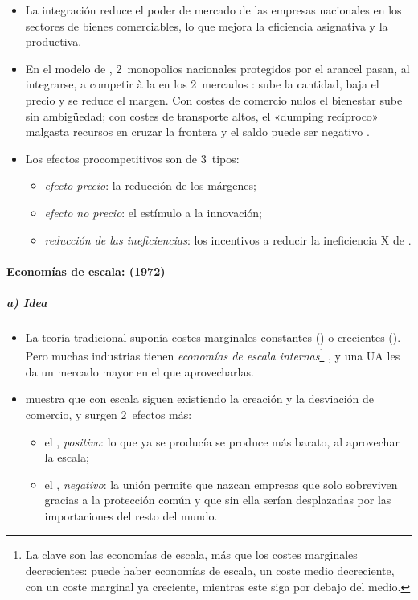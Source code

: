 \documentclass[11pt]{article}
\begin{document}
\begin{itemize}
\item La integración reduce el poder de mercado de las empresas nacionales en los sectores de bienes comerciables, lo que mejora la eficiencia asignativa y la productiva.
\item En el modelo de \textcite{BranderKrugman1983Reciprocal}, 2~monopolios nacionales protegidos por el arancel pasan, al integrarse, a competir à la  en los 2~mercados : sube la cantidad, baja el precio y se reduce el margen. Con costes de comercio nulos el bienestar sube sin ambigüedad; con costes de transporte altos, el «dumping recíproco» malgasta recursos en cruzar la frontera y el saldo puede ser negativo  .
\item Los efectos procompetitivos son de 3~tipos:
  \begin{itemize}
  \item \emph{efecto precio}: la reducción de los márgenes;
  \item \emph{efecto no precio}: el estímulo a la innovación;
  \item \emph{reducción de las ineficiencias}: los incentivos a reducir la ineficiencia X de \textcite{Leibenstein1966Allocative} .
  \end{itemize}
\end{itemize}

\paragraph{Economías de escala:  (1972)}

\subparagraph{a) Idea}

\begin{itemize}
\item La teoría tradicional suponía costes marginales constantes () o crecientes (). Pero muchas industrias tienen \emph{economías de escala internas}\footnote{La clave son las economías de escala, más que los costes marginales decrecientes: puede haber economías de escala, un coste medio decreciente, con un coste marginal ya creciente, mientras este siga por debajo del medio.} , y una UA les da un mercado mayor en el que aprovecharlas.
\item \textcite{Corden1972Economies} muestra que con escala siguen existiendo la creación y la desviación de comercio, y surgen 2~efectos más:
  \begin{itemize}
  \item el , \emph{positivo}: lo que ya se producía se produce más barato, al aprovechar la escala;
  \item el , \emph{negativo}: la unión permite que nazcan empresas que solo sobreviven gracias a la protección común y que sin ella serían desplazadas por las importaciones del resto del mundo.
  \end{itemize}
\end{itemize}
\end{document}
